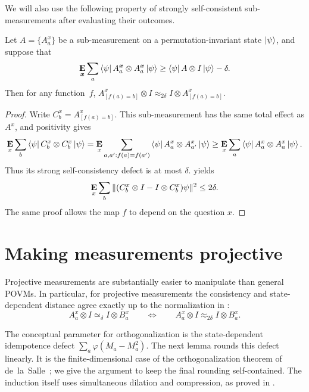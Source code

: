 \documentclass[11pt]{article}
\theoremstyle{definition}
\newcommand{\E}{\mathop{\bf E\/}}
\newcommand{\ot}{\otimes}
\newcommand{\bx}{{\boldsymbol{x}}}
\begin{document}
We will also use the following property of strongly self-consistent
sub-measurements after evaluating their outcomes.

\begin{proposition}\label{prop:two-notions-of-self-consistency-after-evaluation}
Let $A=\{A_a^x\}$ be a sub-measurement on a
permutation-invariant state $\ket\psi$, and suppose that
\begin{equation*}
\E_{\bx} \sum_a \bra{\psi} A^{\bx}_a \otimes A^{\bx}_a \ket{\psi} \geq  \bra{\psi} A \otimes I \ket{\psi} - \delta.
\end{equation*}
Then for any function~$f$,
$A^x_{[f(a)=b]} \otimes I \approx_{2\delta} I \otimes A^x_{[f(a)=b]}$.
\end{proposition}
\begin{proof}
Write $C_b^x=A^x_{[f(a)=b]}$.  This sub-measurement has the same
total effect as $A^x$, and positivity gives
\[
 \E_x\sum_b\bra\psi C_b^x\otimes C_b^x\ket\psi
 =\E_x\sum_{a,a':f(a)=f(a')}\bra\psi A_a^x\otimes A_{a'}^x\ket\psi
 \geq\E_x\sum_a\bra\psi A_a^x\otimes A_a^x\ket\psi.
\]
Thus its strong self-consistency defect is at most $\delta$.
 yields
\begin{equation}\label{eq:evaluated-self-consistency-bound}
 \E_x\sum_b\|(C_b^x\otimes I-I\otimes C_b^x)\psi\|^2\leq2\delta.
\end{equation}
The same proof allows the map $f$ to depend on the question $x$.
\end{proof}


\section{Making measurements projective}
\label{sec:making-measurements-projective}

Projective measurements are substantially easier to manipulate than general
POVMs.  In particular, for projective measurements the consistency and
state-dependent distance agree exactly up to the normalization in
:
\begin{equation*}
A^x_a \ot I \simeq_{\delta} I \ot B^x_a
\qquad\Longleftrightarrow\qquad
A^x_a \ot I \approx_{2\delta} I \ot B^x_a.
\end{equation*}

The conceptual parameter for orthogonalization is the state-dependent
idempotence defect $\sum_a\varphi(M_a-M_a^2)$.  The next lemma rounds
this defect linearly.  It is the finite-dimensional case of the
orthogonalization theorem of de~la~Salle~\cite{deLaSalle22}; we give the
argument to keep the final rounding self-contained.  The induction
itself uses simultaneous dilation and compression, as proved in
.
\end{document}
